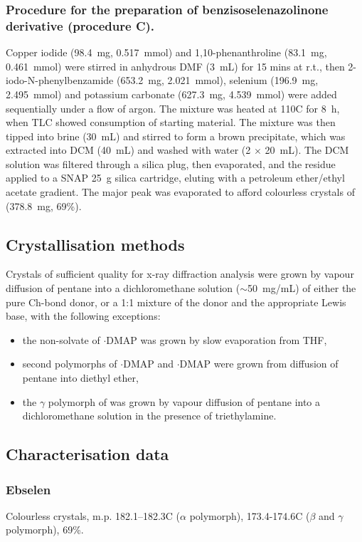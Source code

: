 \begin{refsection}
\subsubsection[General procedure C]{Procedure for the preparation of benzisoselenazolinone derivative  (procedure C).}
Copper iodide (98.4~mg, 0.517~mmol) and 1,10-phenanthroline (83.1~mg, 0.461~mmol) were stirred in anhydrous DMF (3~mL) for 15 mins at r.t., then 2-iodo-N-phenylbenz\-amide (653.2~mg, 2.021~mmol), selenium (196.9~mg, 2.495~mmol) and potassium carbonate (627.3~mg, 4.539~mmol) were added sequentially under a flow of argon.
The mixture was heated at 110\degree C for 8~h, when TLC showed consumption of starting material.
The mixture was then tipped into brine (30~mL) and stirred to form a brown precipitate, which was extracted into DCM (40~mL) and washed with water (2 $\times$ 20~mL).
The DCM solution was filtered through a silica plug, then evaporated, and the residue applied to a SNAP 25~g silica cartridge, eluting with a petroleum ether/ethyl acetate gradient.
The major peak was evaporated to afford colourless crystals of  (378.8~mg, 69\%).

\subsection{Crystallisation methods}
Crystals of sufficient quality for x-ray diffraction analysis were grown by vapour diffusion of pentane into a dichloromethane solution ($\sim$50~mg/mL) of either the pure Ch-bond donor, or a 1:1 mixture of the donor and the appropriate Lewis base, with the following exceptions:
\begin{itemize}
    \item the non-solvate of $\cdot$DMAP was grown by slow evaporation from THF,
    \item second polymorphs of $\cdot$DMAP and $\cdot$DMAP were grown from diffusion of pentane into diethyl ether,
    \item the $\gamma$ polymorph of  was grown by vapour diffusion of pentane into a dichloromethane solution in the presence of triethylamine.
\end{itemize}

\subsection{Characterisation data}

\subsubsection{Ebselen }
Colourless crystals, m.p. 182.1--182.3\degree C ($\alpha$ polymorph), 173.4-174.6\degree C ($\beta$ and $\gamma$ polymorph), 69\%.


\end{refsection}
